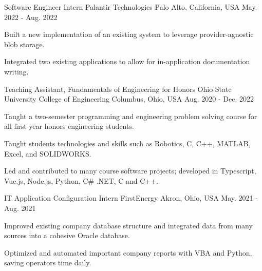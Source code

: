 

\begin{cventries}

  \cventry
    {Software Engineer Intern} %
    {Palantir Technologies} %
    {Palo Alto, California, USA} %
    {May. 2022 - Aug. 2022} %
    {
      \begin{cvitems} %
        \item {Built a new implementation of an existing system to leverage provider-agnostic blob storage.}
        \item {Integrated two existing applications to allow for in-application documentation writing.}
       \end{cvitems}
    }

  \cventry
    {Teaching Assistant, Fundamentals of Engineering for Honors} %
    {Ohio State University College of Engineering} %
    {Columbus, Ohio, USA} %
    {Aug. 2020 - Dec. 2022} %
    {
      \begin{cvitems} %
        \item {Taught a two-semester programming and engineering problem solving course for all first-year honors engineering students.}
        \item {Taught students technologies and skills such as Robotics, C, C++, MATLAB, Excel, and SOLIDWORKS.}
        \item {Led and contributed to many course software projects; developed in Typescript, Vue.js, Node.js, Python, C\# .NET, C and C++.}
      \end{cvitems}
    }
    
  \cventry
    {IT Application Configuration Intern} %
    {FirstEnergy} %
    {Akron, Ohio, USA} %
    {May. 2021 - Aug. 2021} %
    {
      \begin{cvitems} %
        \item {Improved existing company database structure and integrated data from many sources into a cohesive Oracle database.}
        \item {Optimized and automated important company reports with VBA and Python, saving operators time daily.}
      \end{cvitems}
    }
    

\end{cventries}

